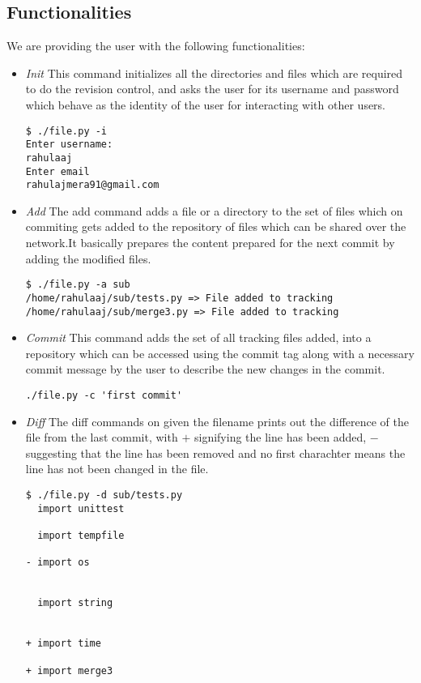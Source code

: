 \documentclass[12pt]{article}
\begin{document}
\subsection{Functionalities}
We are providing the user with the following functionalities:
\begin{itemize}
\item \emph{Init} This command initializes all the directories and files which are required to do the revision control, and asks the user for its username and password which behave as the identity of the user for interacting with other users.
\begin{lstlisting}
$ ./file.py -i
Enter username:
rahulaaj
Enter email 
rahulajmera91@gmail.com
\end{lstlisting}
\item \emph{Add} The add command adds a file or a directory to the set of files which on commiting gets added to the repository of files which can be shared over the network.It basically prepares the content prepared for the next commit by adding the modified files. 
\begin{lstlisting}
$ ./file.py -a sub
/home/rahulaaj/sub/tests.py => File added to tracking
/home/rahulaaj/sub/merge3.py => File added to tracking
\end{lstlisting}
\item \emph{Commit} This command adds the set of all tracking files added, into a repository which can be accessed using the commit tag along with a necessary commit message by the user to describe the new changes in the commit. 
\begin{lstlisting}
./file.py -c 'first commit'
\end{lstlisting}
\item \emph{Diff} The diff commands on given the filename prints out the difference of the file from the last commit, with $+$ signifying the line has been added, $-$ suggesting that the line has been removed and no first charachter means the line has not been changed in the file.
\begin{lstlisting}
$ ./file.py -d sub/tests.py 
  import unittest

  import tempfile

- import os


  import string


+ import time

+ import merge3


\end{lstlisting}
\end{itemize}
\end{document}
